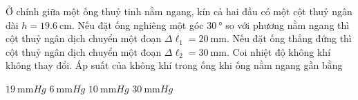 \begin{ex}
Ở chính giữa một ống thuỷ tinh nằm ngang, kín cả hai đầu có một cột thuỷ ngân dài $h=\SI{19.6}{\centi\meter}$. Nếu đặt ống nghiêng một góc $\SI{30}{\degree}$ so với phương nằm ngang thì cột thuỷ ngân dịch chuyển một đoạn $\Delta \ell_1=\SI{20}{\milli\meter}$. Nếu đặt ống thẳng đứng thì cột thuỷ ngân dịch chuyển một đoạn $\Delta \ell_2=\SI{30}{\milli\meter}$. Coi nhiệt độ không khí không thay đổi. Áp suất của không khí trong ống khi ống nằm ngang gần bằng
	
	\choice
	{$\SI{19}{\milli\meter Hg}$}
	{$\SI{6}{\milli\meter Hg}$}
	{\True $\SI{10}{\milli\meter Hg}$}
	{$\SI{30}{\milli\meter Hg}$}
\end{ex}
